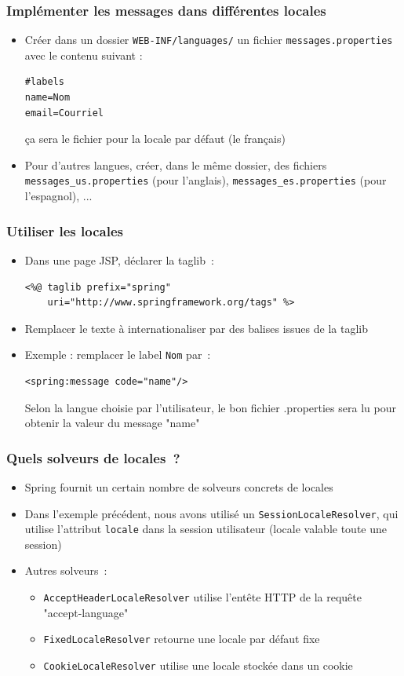\documentclass{beamer}
\begin{document}
\begin{frame}[fragile]
	\frametitle{Implémenter les messages dans différentes locales}
	\begin{itemize}
		\item Créer dans un dossier \texttt{WEB-INF/languages/} un fichier \texttt{messages.properties} avec le contenu suivant :
\begin{lstlisting}
#labels
name=Nom
email=Courriel
\end{lstlisting}
ça sera le fichier pour la locale par défaut (le français)
\item Pour d'autres langues, créer, dans le même dossier, des fichiers \texttt{messages\_us.properties} (pour l'anglais), \texttt{messages\_es.properties} (pour l'espagnol), ...
	\end{itemize}
\end{frame}

\begin{frame}[fragile]
	\frametitle{Utiliser les locales}
	\begin{itemize}
		\item Dans une page JSP, déclarer la taglib~:
\begin{lstlisting}
<%@ taglib prefix="spring"
    uri="http://www.springframework.org/tags" %>
\end{lstlisting}
\item Remplacer le texte à internationaliser par des balises issues de la taglib
\item Exemple : remplacer le label \texttt{Nom} par~:
\begin{lstlisting}
<spring:message code="name"/>
\end{lstlisting}
Selon la langue choisie par l'utilisateur, le bon fichier .properties sera lu pour obtenir la valeur du message "name"
	\end{itemize}
\end{frame}

\begin{frame}
	\frametitle{Quels solveurs de locales~?}
	\begin{itemize}
		\item Spring fournit un certain nombre de solveurs concrets de locales
		\item Dans l'exemple précédent, nous avons utilisé un \texttt{SessionLocaleResolver}, qui utilise l'attribut \texttt{locale} dans la session utilisateur (locale valable toute une session)
		\item Autres solveurs~:
		\begin{itemize}
			\item \texttt{AcceptHeaderLocaleResolver} utilise l'entête HTTP de la requête "accept-language"
			\item \texttt{FixedLocaleResolver} retourne une locale par défaut fixe
			\item \texttt{CookieLocaleResolver} utilise une locale stockée dans un cookie
		\end{itemize}
	\end{itemize}
\end{frame} 
\end{document}
